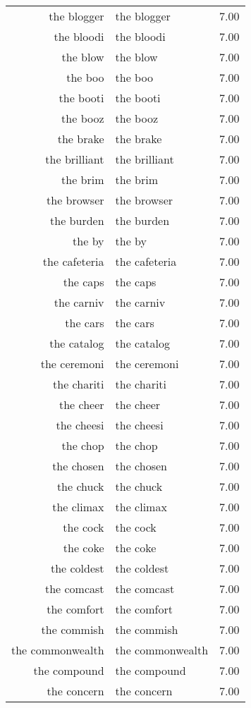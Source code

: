 \begin{table}[ht]
\begin{tabular}{rlr}
  the blogger & the blogger & 7.00 \\ 
  the bloodi & the bloodi & 7.00 \\ 
  the blow & the blow & 7.00 \\ 
  the boo & the boo & 7.00 \\ 
  the booti & the booti & 7.00 \\ 
  the booz & the booz & 7.00 \\ 
  the brake & the brake & 7.00 \\ 
  the brilliant & the brilliant & 7.00 \\ 
  the brim & the brim & 7.00 \\ 
  the browser & the browser & 7.00 \\ 
  the burden & the burden & 7.00 \\ 
  the by & the by & 7.00 \\ 
  the cafeteria & the cafeteria & 7.00 \\ 
  the caps & the caps & 7.00 \\ 
  the carniv & the carniv & 7.00 \\ 
  the cars & the cars & 7.00 \\ 
  the catalog & the catalog & 7.00 \\ 
  the ceremoni & the ceremoni & 7.00 \\ 
  the chariti & the chariti & 7.00 \\ 
  the cheer & the cheer & 7.00 \\ 
  the cheesi & the cheesi & 7.00 \\ 
  the chop & the chop & 7.00 \\ 
  the chosen & the chosen & 7.00 \\ 
  the chuck & the chuck & 7.00 \\ 
  the climax & the climax & 7.00 \\ 
  the cock & the cock & 7.00 \\ 
  the coke & the coke & 7.00 \\ 
  the coldest & the coldest & 7.00 \\ 
  the comcast & the comcast & 7.00 \\ 
  the comfort & the comfort & 7.00 \\ 
  the commish & the commish & 7.00 \\ 
  the commonwealth & the commonwealth & 7.00 \\ 
  the compound & the compound & 7.00 \\ 
  the concern & the concern & 7.00 \\ 

\end{tabular}
\end{table}
